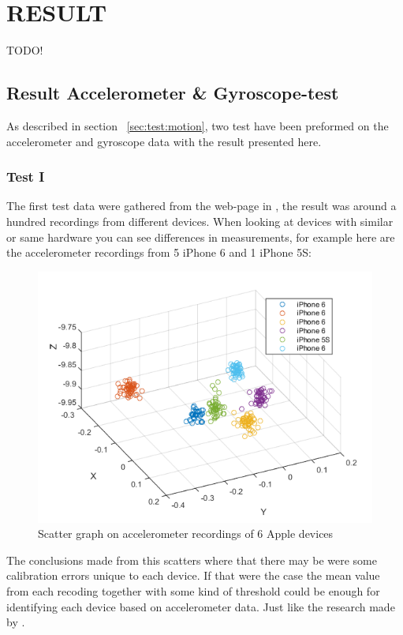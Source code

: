 \chapter{RESULT}\label{cha:result}
TODO!

\section{Result Accelerometer \& Gyroscope-test}
As described in section ~\ref{sec:test:motion}, two test have been preformed on the accelerometer and gyroscope data with the result presented here.
\subsection{Test I}
The first test data were gathered from the web-page in , the result was around a hundred recordings from different devices. When looking at devices with similar or same hardware you can see differences in measurements, for example here are the accelerometer recordings from 5 iPhone 6 and 1 iPhone 5S:
\begin{figure}[H]
\centering
\includegraphics[scale=.7]{img/scatteriPhone}
\caption{Scatter graph on accelerometer recordings of 6 Apple devices}
\label{fig:digraph}
\end{figure}
The conclusions made from this scatters where that there may be were some calibration errors unique to each device. If that were the case the mean value from each recoding together with some kind of threshold could be enough for identifying each device based on accelerometer data. Just like the research made by \cite{sensor:micSpek}. 

